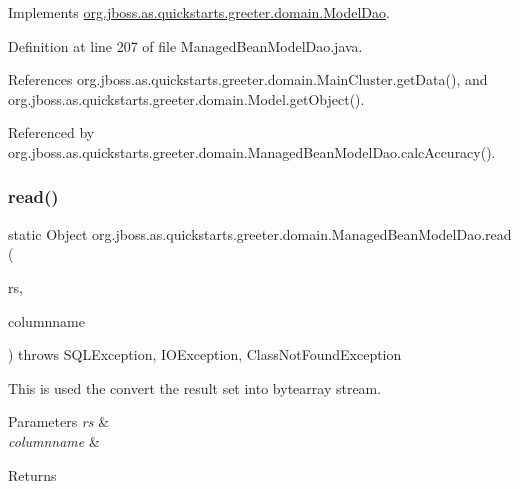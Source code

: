 Implements \hyperlink{interfaceorg_1_1jboss_1_1as_1_1quickstarts_1_1greeter_1_1domain_1_1_model_dao_ac57ecc08e389fcc50bd26a3fbe579de3}{org.\+jboss.\+as.\+quickstarts.\+greeter.\+domain.\+Model\+Dao}.



Definition at line 207 of file Managed\+Bean\+Model\+Dao.\+java.



References org.\+jboss.\+as.\+quickstarts.\+greeter.\+domain.\+Main\+Cluster.\+get\+Data(), and org.\+jboss.\+as.\+quickstarts.\+greeter.\+domain.\+Model.\+get\+Object().



Referenced by org.\+jboss.\+as.\+quickstarts.\+greeter.\+domain.\+Managed\+Bean\+Model\+Dao.\+calc\+Accuracy().

\mbox{\label{classorg_1_1jboss_1_1as_1_1quickstarts_1_1greeter_1_1domain_1_1_managed_bean_model_dao_a81e8eb5de194e97e02443928b9587753}} 
\subsubsection{\texorpdfstring{read()}{read()}}
{\footnotesize\ttfamily static Object org.\+jboss.\+as.\+quickstarts.\+greeter.\+domain.\+Managed\+Bean\+Model\+Dao.\+read (\begin{DoxyParamCaption}\item[{Result\+Set}]{rs,  }\item[{String}]{columnname }\end{DoxyParamCaption}) throws S\+Q\+L\+Exception, I\+O\+Exception, Class\+Not\+Found\+Exception\hspace{0.3cm}{\ttfamily [static]}}



This is used the convert the result set into bytearray stream. 


\begin{DoxyParams}{Parameters}
{\em rs} & \\
\hline
{\em columnname} & \\
\hline
\end{DoxyParams}
\begin{DoxyReturn}{Returns}

\end{DoxyReturn}

